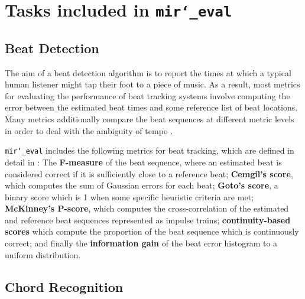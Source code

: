 \documentclass{article}
\def\mireval{\texttt{mir\char`_eval}}
\begin{document}

\section{Tasks included in \mireval{}}
\label{sec:tasks}

\subsection{Beat Detection}

The aim of a beat detection algorithm is to report the times at which a typical human listener might tap their foot to a piece of music.
As a result, most metrics for evaluating the performance of beat tracking systems involve computing the error between the estimated beat times and some reference list of beat locations.
Many metrics additionally compare the beat sequences at different metric levels in order to deal with the ambiguity of tempo \cite{levy2011improving}.

\mireval{} includes the following metrics for beat tracking, which are defined in detail in \cite{davies2009evaluation}:
The \textbf{F-measure} of the beat sequence, where an estimated beat is considered correct if it is sufficiently close to a reference beat;
\textbf{Cemgil's score}, which computes the sum of Gaussian errors for each beat;
\textbf{Goto's score}, a binary score which is 1 when some specific heuristic criteria are met;
\textbf{McKinney's P-score}, which computes the cross-correlation of the estimated and reference beat sequences represented as impulse trains;
\textbf{continuity-based scores} which compute the proportion of the beat sequence which is continuously correct;
and finally the \textbf{information gain} of the beat error histogram to a uniform distribution.

\subsection{Chord Recognition}

\end{document}
